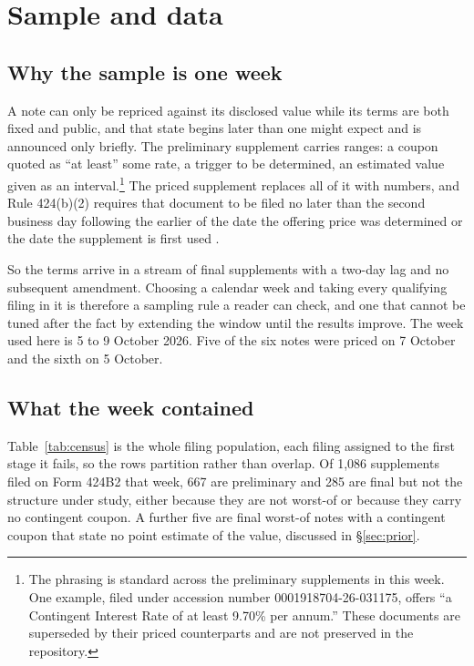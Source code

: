 \section{Sample and data}\label{sec:data}

\subsection{Why the sample is one week}

A note can only be repriced against its disclosed value while its terms are
both fixed and public, and that state begins later than one might expect and is
announced only briefly. The preliminary supplement carries ranges: a coupon quoted as
``at least'' some rate, a trigger to be determined, an estimated value given as
an interval.\footnote{The phrasing is standard across the preliminary
supplements in this week. One example, filed under accession number
0001918704-26-031175, offers ``a Contingent Interest Rate of at least 9.70\%
per annum.'' These documents are superseded by their priced counterparts and
are not preserved in the repository.} The priced supplement replaces all of it with numbers, and Rule
424(b)(2) requires that document to be filed no later than the second business
day following the earlier of the date the offering price was determined or the
date the supplement is first used \citep{SEC424b2}.

So the terms arrive in a stream of final supplements with a two-day lag and no
subsequent amendment. Choosing a calendar week and taking every qualifying
filing in it is therefore a sampling rule a reader can check, and one that
cannot be tuned after the fact by extending the window until the results
improve. The week used here is 5 to 9 October 2026. Five of the six notes were
priced on 7 October and the sixth on 5 October.

\subsection{What the week contained}



Table~\ref{tab:census} is the whole filing population, each filing assigned to
the first stage it fails, so the rows partition rather than overlap. Of 1{,}086
supplements filed on Form 424B2 that week, 667 are preliminary and 285 are
final but not the structure under study, either because they are not worst-of or
because they carry no contingent coupon. A further five are final worst-of notes
with a contingent coupon that state no point estimate of the value, discussed
in \S\ref{sec:prior}.

